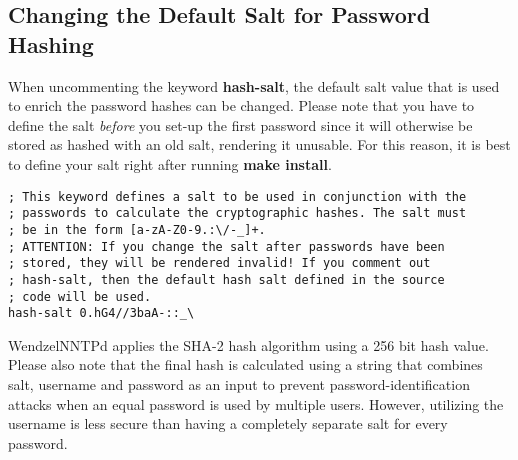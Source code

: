 \subsection{Changing the Default Salt for Password Hashing}

When uncommenting the keyword \textbf{hash-salt}, the default salt value that is used to enrich the password hashes can be changed. Please note that you have to define the salt \textit{before} you set-up the first password since it will otherwise be stored as hashed with an old salt, rendering it unusable. For this reason, it is best to define your salt right after running \textbf{make install}.

\begin{verbatim}
; This keyword defines a salt to be used in conjunction with the
; passwords to calculate the cryptographic hashes. The salt must
; be in the form [a-zA-Z0-9.:\/-_]+.
; ATTENTION: If you change the salt after passwords have been
; stored, they will be rendered invalid! If you comment out
; hash-salt, then the default hash salt defined in the source
; code will be used.
hash-salt 0.hG4//3baA-::_\
\end{verbatim}

WendzelNNTPd applies the SHA-2 hash algorithm using a 256 bit hash value. Please also note that the final hash is calculated using a string that combines salt, username and password as an input to prevent password-identification attacks when an equal password is used by multiple users. However, utilizing the username is less secure than having a completely separate salt for every password.


